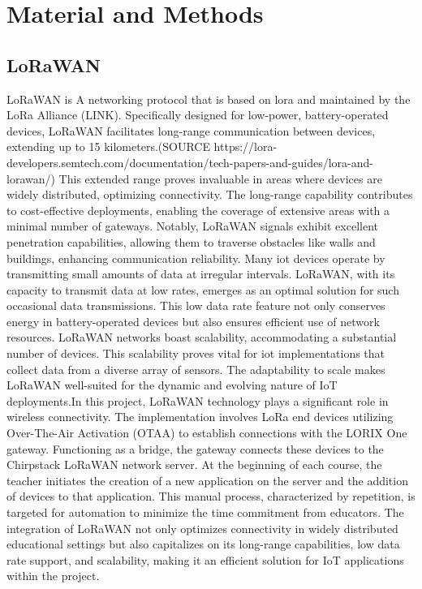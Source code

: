 
\chapter{Material and Methods} \label{ch:mat_met}
\section{LoRaWAN}
LoRaWAN is A networking protocol that is based on \gls{lora} and maintained by the LoRa Alliance (LINK). Specifically designed for low-power, battery-operated devices, LoRaWAN facilitates long-range communication between devices, extending up to 15 kilometers.(SOURCE https://lora-developers.semtech.com/documentation/tech-papers-and-guides/lora-and-lorawan/) This extended range proves invaluable in areas where devices are widely distributed, optimizing connectivity. The long-range capability contributes to cost-effective deployments, enabling the coverage of extensive areas with a minimal number of gateways. Notably, LoRaWAN signals exhibit excellent penetration capabilities, allowing them to traverse obstacles like walls and buildings, enhancing communication reliability. Many \gls{iot} devices operate by transmitting small amounts of data at irregular intervals. LoRaWAN, with its capacity to transmit data at low rates, emerges as an optimal solution for such occasional data transmissions. This low data rate feature not only conserves energy in battery-operated devices but also ensures efficient use of network resources.  LoRaWAN networks boast scalability, accommodating a substantial number of devices. This scalability proves vital for \gls{iot} implementations that collect data from a diverse array of sensors. The adaptability to scale makes LoRaWAN well-suited for the dynamic and evolving nature of IoT deployments.In this project, LoRaWAN technology plays a significant role in wireless connectivity. The implementation involves LoRa end devices utilizing Over-The-Air Activation (OTAA) to establish connections with the LORIX One gateway. Functioning as a bridge, the gateway connects these devices to the Chirpstack LoRaWAN network server. At the beginning of each course, the teacher initiates the creation of a new application on the server and the addition of devices to that application. This manual process, characterized by repetition, is targeted for automation to minimize the time commitment from educators. The integration of LoRaWAN not only optimizes connectivity in widely distributed educational settings but also capitalizes on its long-range capabilities, low data rate support, and scalability, making it an efficient solution for IoT applications within the project.

